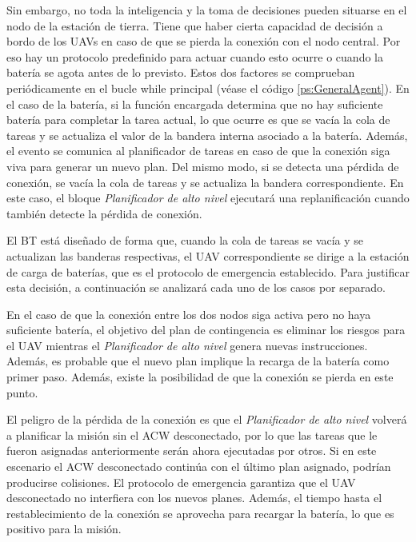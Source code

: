 \documentclass[fontsize=11pt, English=false, Español=true, Myfinal=true, twoside, numbers=noenddot]{scrbook}
\begin{document}
Sin embargo, no toda la inteligencia y la toma de decisiones pueden situarse en el nodo de la estación de tierra. Tiene que haber cierta capacidad de decisión a bordo de los \glspl{UAV} en caso de que se pierda la conexión con el nodo central. Por eso hay un protocolo predefinido para actuar cuando esto ocurre o cuando la batería se agota antes de lo previsto. Estos dos factores se comprueban periódicamente en el bucle while principal (véase el código \ref{ps:GeneralAgent}). En el caso de la batería, si la función encargada determina que no hay suficiente batería para completar la tarea actual, lo que ocurre es que se vacía la cola de tareas y se actualiza el valor de la bandera interna asociado a la batería. Además, el evento se comunica al planificador de tareas en caso de que la conexión siga viva para generar un nuevo plan. Del mismo modo, si se detecta una pérdida de conexión, se vacía la cola de tareas y se actualiza la bandera correspondiente. En este caso, el bloque \emph{Planificador de alto nivel} ejecutará una replanificación cuando también detecte la pérdida de conexión.

El \gls{BT} está diseñado de forma que, cuando la cola de tareas se vacía y se actualizan las banderas respectivas, el \gls{UAV} correspondiente se dirige a la estación de carga de baterías, que es el protocolo de emergencia establecido. Para justificar esta decisión, a continuación se analizará cada uno de los casos por separado.

En el caso de que la conexión entre los dos nodos siga activa pero no haya suficiente batería, el objetivo del plan de contingencia es eliminar los riesgos para el \gls{UAV} mientras el \emph{Planificador de alto nivel} genera nuevas instrucciones. Además, es probable que el nuevo plan implique la recarga de la batería como primer paso. Además, existe la posibilidad de que la conexión se pierda en este punto.

El peligro de la pérdida de la conexión es que el \emph{Planificador de alto nivel} volverá a planificar la misión sin el \gls{ACW} desconectado, por lo que las tareas que le fueron asignadas anteriormente serán ahora ejecutadas por otros. Si en este escenario el \gls{ACW} desconectado continúa con el último plan asignado, podrían producirse colisiones. El protocolo de emergencia garantiza que el \gls{UAV} desconectado no interfiera con los nuevos planes. Además, el tiempo hasta el restablecimiento de la conexión se aprovecha para recargar la batería, lo que es positivo para la misión.
\end{document}
